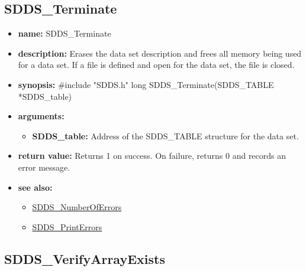 \documentclass[11pt]{article}
\newcommand{\progref}[1]{\hyperref{SDDS_#1}{{\tt SDDS\_#1} (}{)}{SDDS_#1}}
\begin{document}
\subsection{SDDS\_Terminate}
\label{SDDS_Terminate}

\begin{itemize}
\item {\bf name:}\newline
SDDS\_Terminate
\item {\bf description:}\newline
Erases the data set description and frees all memory being used for a data set. If a file is defined and open for the data set, the file is closed.
\item {\bf synopsis:} \#include "SDDS.h"\newline
long SDDS\_Terminate(SDDS\_TABLE *SDDS\_table)
\item {\bf arguments:}
\begin{itemize}
\item {\bf SDDS\_table:} Address of the SDDS\_TABLE structure for the data set.
\end{itemize}
\item {\bf return value:}\newline
Returns 1 on success. On failure, returns 0 and records an error message.
\item {\bf see also:}
\begin{itemize}
\item \progref{NumberOfErrors}
\item \progref{PrintErrors}
\end{itemize}
\end{itemize}

\subsection{SDDS\_VerifyArrayExists}
\label{SDDS_VerifyArrayExists}
\end{document}

